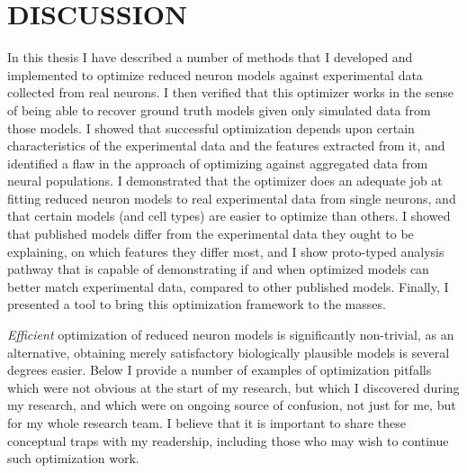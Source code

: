 \chapter{DISCUSSION}
In this thesis I have described a number of methods that I developed and implemented to optimize reduced neuron models against experimental data collected from real neurons.
I then verified that this optimizer works in the sense of being able to recover ground truth models given only simulated data from those models.
I showed that successful optimization depends upon certain characteristics of the experimental data and the features extracted from it, and identified a flaw in the approach of optimizing against aggregated data from neural populations. 
I demonstrated that the optimizer does an adequate job at fitting reduced neuron models to real experimental data from single neurons, and that certain models (and cell types) are easier to optimize than others.
I showed that published models differ from the experimental data they ought to be explaining, on which features they differ most, and I show proto-typed analysis pathway that is capable of demonstrating if and when optimized models can better match experimental data, compared to other published models.
Finally, I presented a tool to bring this optimization framework to the masses.

\emph{Efficient} optimization of reduced neuron models is significantly non-trivial, as an alternative, obtaining merely satisfactory biologically plausible models is several degrees easier.
Below I provide a number of examples of optimization pitfalls which were not obvious at the start of my research, but which I discovered during my research, and which were on ongoing source of confusion, not just for me, but for my whole research team.
I believe that it is important to share these conceptual traps with my readership, including those who may wish to continue such optimization work.







